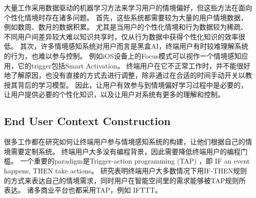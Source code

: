 大量工作采用数据驱动的机器学习方法来学习用户的情境偏好\cite{rashidi_keeping_2009,aztiria_discovering_2012}，但这些方法在面向个性化情境时存在诸多问题。
首先，这些系统都需要较为大量的用户情境数据，例如数周、数月的数据积累\cite{mehrotra_prefminer_2016,zhang_trace2tap_2020,zhu_mining_2015,srinivasan_mobileminer_2014}。
尤其是当用户的个性化情境和行为数据较为稀疏、不同用户间差异较大难以知识共享时，仅从行为数据中获得个性化知识的效率很低。
其次，许多情境感知系统对用户而言是黑盒AI，终端用户有时较难理解系统的行为，也难以参与控制\cite{amershi_guidelines_2019,yang_learning_2013,barkhuus_is_2003,dey_support_2009}。
例如iOS设备上的Focus模式可以视作一个情境感知应用，它的trigger包括Smart Activation。
终端用户在它不正常工作时，并不能很好地了解原因，也没有直接的方式去进行调整，除非通过在合适的时间手动开关以教授其背后的学习模型。
因此，让用户有效参与到情境偏好学习过程中是必要的，让用户提供必要的个性化知识，以及让用户对系统有更多的理解和控制。


\subsection{End User Context Construction}

很多工作都在研究如何让终端用户参与情境感知系统的构建，让他们根据自己的情境需要定制系统\cite{lieberman_end-user_2006}。
终端用户大多没有编程背景，因此需要降低终端用户的编程门槛。
一个重要的paradigm是Trigger-action programming (TAP) ，即 IF an event happens, THEN take actions。
研究表明终端用户大多数情况下用IF-THEN规则的方式来表达自己的情境需求\cite{dey_icap_2006}，同时用户在智能空间里的需求能够被TAP规则所表达\cite{ur_practical_2014}。
诸多商业平台也都采用TAP，例如
IFTTT\cite{ifttt_ifttt_2023}。


